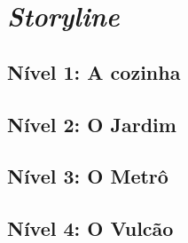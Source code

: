 \chapter{\textit{Storyline}}\label{cap:estArte}

\lipsum[34]

\section*{Nível 1: A cozinha}\label{sec:primTrab}

\lipsum[34-36]

\section*{Nível 2: O Jardim}\label{sec:primTrab}

\lipsum[34-36]

\section*{Nível 3: O Metrô}\label{sec:primTrab}

\lipsum[34-36]

\section*{Nível 4: O Vulcão}\label{sec:primTrab}

\lipsum[34-36]